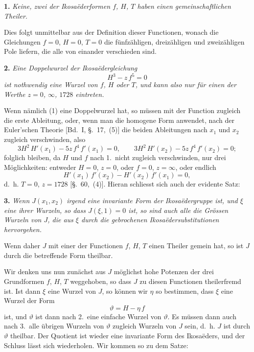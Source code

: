 \documentclass[12pt,a4paper]{article}
\begin{document}
\medskip\noindent
\textbf{1.} \emph{Keine, zwei der Ikosaëderformen $f$, $H$, $T$ haben einen gemeinschaftlichen Theiler.}

Dies folgt unmittelbar aus der Definition dieser Functionen, wonach die Gleichungen $f = 0$, $H = 0$, $T = 0$ die fünfzähligen, dreizähligen und zweizähligen Pole liefern, die alle von einander verschieden sind.

\medskip\noindent
\textbf{2.} \emph{Eine Doppelwurzel der Ikosaëdergleichung}
\begin{equation}\label{eq:61.1}
\tag{1}
H^{3} - z\,f^{5} = 0
\end{equation}
\emph{ist nothwendig eine Wurzel von $f$, $H$ oder $T$, und kann also nur für einen der Werthe $z = 0$, $\infty$, $1728$ eintreten.}

Wenn nämlich (1) eine Doppelwurzel hat, so müssen mit der Function zugleich die erste Ableitung, oder, wenn man die homogene Form anwendet, nach der Euler'schen Theorie [Bd.~I, \S.~17,~(5)] die beiden Ableitungen nach $x_{1}$ und $x_{2}$ zugleich verschwinden, also
\[
3H^{2}\,H'(x_{1}) - 5z\,f^{4}\,f'(x_{1}) = 0,\qquad
3H^{2}\,H'(x_{2}) - 5z\,f^{4}\,f'(x_{2}) = 0;
\]
folglich bleiben, da $H$ und $f$ nach 1.~nicht zugleich verschwinden, nur drei Möglichkeiten: entweder $H = 0$, $z = 0$, oder $f = 0$, $z = \infty$, oder endlich
\[
H'(x_{1})\,f'(x_{2}) - H'(x_{2})\,f'(x_{1}) = 0,
\]
d.~h. $T = 0$, $z = 1728$ [\S.~60,~(4)]. Hieran schliesst sich auch der evidente Satz:

\medskip\noindent
\textbf{3.} \emph{Wenn $J(x_{1},x_{2})$ irgend eine invariante Form der Ikosaëdergruppe ist, und $\xi$ eine ihrer Wurzeln, so dass $J(\xi,1) = 0$ ist, so sind auch alle die Grössen Wurzeln von $J$, die aus $\xi$ durch die gebrochenen Ikosaëdersubstitutionen hervorgehen.}

Wenn daher $J$ mit einer der Functionen $f$, $H$, $T$ einen Theiler gemein hat, so ist $J$ durch die betreffende Form theilbar.

Wir denken uns nun zunächst aus $J$ möglichst hohe Potenzen der drei Grundformen $f$, $H$, $T$ weggehoben, so dass $J$ zu diesen Functionen theilerfremd ist. Ist dann $\xi$ eine Wurzel von $J$, so können wir $\eta$ so bestimmen, dass $\xi$ eine Wurzel der Form
\[
\vartheta = H - \eta\,f
\]
ist, und $\vartheta$ ist dann nach 2.~eine einfache Wurzel von $\vartheta$. Es müssen dann auch nach 3.~alle übrigen Wurzeln von $\vartheta$ zugleich Wurzeln von $J$ sein, d.~h. $J$ ist durch $\vartheta$ theilbar. Der Quotient ist wieder eine invariante Form des Ikosaëders, und der Schluss lässt sich wiederholen. Wir kommen so zu dem Satze:
\end{document}
